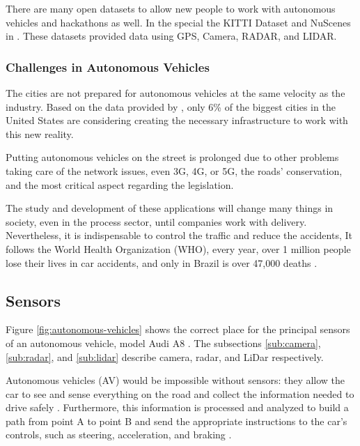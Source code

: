 There are many open datasets to allow new people to work with autonomous vehicles and hackathons as well. In the special the KITTI Dataset \cite{geiger2013vision} and NuScenes in \cite{caesar2020nuscenes}. These datasets provided data using GPS, Camera, RADAR, and LIDAR. 

\subsubsection{Challenges in Autonomous Vehicles}

The cities are not prepared for autonomous vehicles at the same velocity as the industry. Based on the data provided by \cite{cutler2015many}, only 6\% of the biggest cities in the United States are considering creating the necessary infrastructure to work with this new reality.

Putting autonomous vehicles on the street is prolonged due to other problems taking care of the network issues, even 3G, 4G, or 5G, the roads' conservation, and the most critical aspect regarding the legislation. 

The study and development of these applications will change many things in society, even in the process sector, until companies work with delivery. Nevertheless, it is indispensable to control the traffic and reduce the accidents, It follows the World Health Organization (WHO), every year, over 1 million people lose their lives in car accidents, and only in Brazil is over 47,000 deaths \cite{world2004world}. 





\subsection{Sensors}\label{sensors}

Figure \ref{fig:autonomous-vehicles} shows the correct place for the principal sensors of an autonomous vehicle, model Audi A8 \cite{ross2017audi}. The subsections \ref{sub:camera}, \ref{sub:radar}, and
\ref{sub:lidar} describe camera, radar, and LiDar respectively. 

Autonomous vehicles (AV) would be impossible without sensors: they allow the car to see and sense everything on the road and collect the information needed to drive safely \cite{kocic2018sensors}. Furthermore, this information is processed and analyzed to build a path from point A to point B and send the appropriate instructions to the car's controls, such as steering, acceleration, and braking \cite{kato2015open}.

